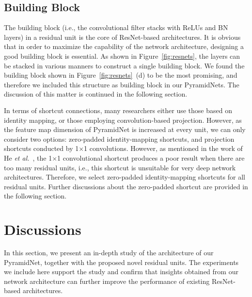 \documentclass[10pt,twocolumn,letterpaper]{article}
\begin{document}
\subsection{Building Block}
The building block (i.e., the convolutional filter stacks with ReLUs and BN layers) in a residual unit is the core of ResNet-based architectures. It is obvious that in order to maximize the capability of the network architecture, designing a good building block is essential. As shown in Figure~\ref{fig:resnets}, the layers can be stacked in various manners to construct a single building block. We found the building block shown in Figure~\ref{fig:resnets}~(d) to be the most promising, and therefore we included this structure as building block in our PyramidNets. The discussion of this matter is continued in the following section.

In terms of shortcut connections, many researchers either use those based on identity mapping, or those employing convolution-based projection. However, as the feature map dimension of PyramidNet is increased at every unit, we can only consider two options: zero-padded identity-mapping shortcuts, and projection shortcuts conducted by 1$\times$1 convolutions. However, as mentioned in the work of He {\it et al.}~\cite{preresnet}, the 1$\times$1 convolutional shortcut produces a poor result when there are too many residual units, i.e., this shortcut is unsuitable for very deep network architectures. Therefore, we select zero-padded identity-mapping shortcuts for all residual units. Further discussions about the zero-padded shortcut are provided in the following section.


\section{Discussions}
\label{sec:discussions}
In this section, we present an in-depth study of the architecture of our PyramidNet, together with the proposed novel residual units. The experiments we include here support the study and confirm that insights obtained from our network architecture can further improve the performance of existing ResNet-based architectures.
\end{document}
